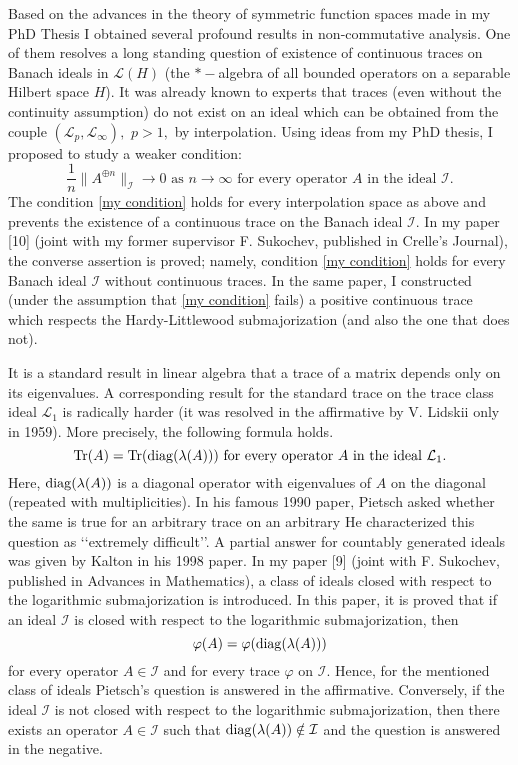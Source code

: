 \documentclass[12pt]{article}
\begin{document}
Based on the advances in the theory of symmetric function spaces made in my PhD Thesis I obtained several profound results in non-commutative analysis. One of them resolves a long standing question of existence of continuous traces on Banach ideals in $\mathcal{L}(H)$ (the $*-$algebra of all bounded operators on a separable Hilbert space $H$). It was already known to experts that traces (even without the continuity assumption) do not exist on an ideal which can be obtained from the couple $(\mathcal{L}_p,\mathcal{L}_{\infty}),$ $p>1,$ by interpolation. Using ideas from my PhD thesis, I proposed to study a weaker condition:
\begin{equation}\label{my condition}
\frac1n\|A^{\oplus n}\|_{\mathcal{I}}\to0\mbox{ as }n\to\infty\mbox{ for every operator }A\mbox{ in the ideal }\mathcal{I}.
\end{equation}
The condition \eqref{my condition} holds for every interpolation space as above and prevents the existence of a continuous trace on the Banach ideal $\mathcal{I}.$ In my paper [10] (joint with my former supervisor F. Sukochev, published in Crelle's Journal), the converse assertion is proved; namely, condition \eqref{my condition} holds for every Banach ideal $\mathcal{I}$ without continuous traces. In the same paper, I constructed (under the assumption that \eqref{my condition} fails) a positive continuous trace which respects the Hardy-Littlewood submajorization (and also the one that does not). 

It is a standard result in linear algebra that a trace of a matrix depends only on its eigenvalues. A corresponding result for the standard trace on the trace class ideal $\mathcal{L}_1$ is radically harder (it was resolved in the affirmative by V. Lidskii only in 1959). More precisely, the following formula holds.
$${\rm Tr}(A)={\rm Tr}({\rm diag}(\lambda(A)))\mbox{ for every operator }A\mbox{ in the ideal }\mathcal{L}_1.$$
Here, ${\rm diag}(\lambda(A))$ is a diagonal operator with eigenvalues of $A$ on the diagonal (repeated with multiplicities). In his famous 1990 paper, Pietsch asked  whether the same is true for an arbitrary trace on an arbitrary%
He characterized this question as \lq\lq extremely difficult\rq\rq. A partial answer for countably generated ideals was given by Kalton in his 1998 paper. In my paper [9] (joint with F. Sukochev, published in Advances in Mathematics), a class of ideals closed with respect to the logarithmic submajorization is introduced. In this paper, it is proved that if an ideal $\mathcal{I}$ is closed with respect to the logarithmic submajorization, then
$$\varphi(A)=\varphi({\rm diag}(\lambda(A)))$$
for every operator $A\in\mathcal{I}$ and for every trace $\varphi$ on $\mathcal{I}.$ Hence, for the mentioned class of ideals Pietsch's question is answered in the affirmative. Conversely, if the ideal $\mathcal{I}$ is not closed with respect to the logarithmic submajorization, then there exists an operator $A\in\mathcal{I}$ such that ${\rm diag}(\lambda(A))\notin\mathcal{I}$ and the question is answered in the negative.
\end{document}
